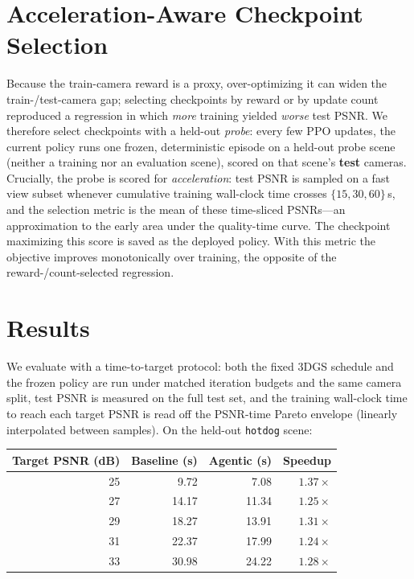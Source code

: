\documentclass[11pt]{article}
\begin{document}
\section{Acceleration-Aware Checkpoint Selection}
\label{sec:selection}

Because the train-camera reward is a proxy, over-optimizing it can widen the
train-/test-camera gap; selecting checkpoints by reward or by update count
reproduced a regression in which \emph{more} training yielded \emph{worse} test
PSNR. We therefore select checkpoints with a held-out \emph{probe}: every few PPO
updates, the current policy runs one frozen, deterministic episode on a held-out
probe scene (neither a training nor an evaluation scene), scored on that scene's
\textbf{test} cameras. Crucially, the probe is scored for \emph{acceleration}: test
PSNR is sampled on a fast view subset whenever cumulative training wall-clock time
crosses $\{15, 30, 60\}$\,s, and the selection metric is the mean of these
time-sliced PSNRs---an approximation to the early area under the quality-time
curve. The checkpoint maximizing this score is saved as the deployed policy. With
this metric the objective improves monotonically over training, the opposite of
the reward-/count-selected regression.

\section{Results}

We evaluate with a time-to-target protocol: both the fixed 3DGS schedule and the
frozen policy are run under matched iteration budgets and the same camera split,
test PSNR is measured on the full test set, and the training wall-clock time to
reach each target PSNR is read off the PSNR-time Pareto envelope (linearly
interpolated between samples). On the held-out \texttt{hotdog} scene:

\begin{center}
\begin{tabular}{@{}rrrr@{}}
\toprule
\textbf{Target PSNR (dB)} & \textbf{Baseline (s)} & \textbf{Agentic (s)} & \textbf{Speedup} \\
\midrule
25 & 9.72  & 7.08  & $1.37\times$ \\
27 & 14.17 & 11.34 & $1.25\times$ \\
29 & 18.27 & 13.91 & $1.31\times$ \\
31 & 22.37 & 17.99 & $1.24\times$ \\
33 & 30.98 & 24.22 & $1.28\times$ \\
\bottomrule
\end{tabular}
\end{center}
\end{document}
